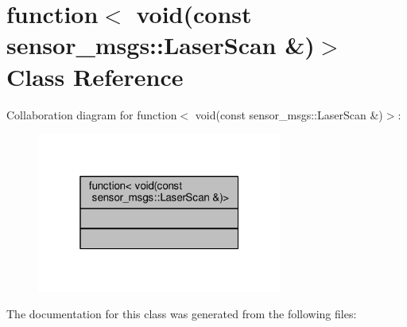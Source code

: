 \hypertarget{classstd_1_1function_3_01void_07const_01sensor__msgs_1_1LaserScan_01_6_08_4}{}\section{function$<$ void(const sensor\+\_\+msgs\+:\+:Laser\+Scan \&)$>$ Class Reference}
\label{classstd_1_1function_3_01void_07const_01sensor__msgs_1_1LaserScan_01_6_08_4}


Collaboration diagram for function$<$ void(const sensor\+\_\+msgs\+:\+:Laser\+Scan \&)$>$\+:\nopagebreak
\begin{figure}[H]
\begin{center}
\leavevmode
\includegraphics[width=229pt]{classstd_1_1function_3_01void_07const_01sensor__msgs_1_1LaserScan_01_6_08_4__coll__graph}
\end{center}
\end{figure}


The documentation for this class was generated from the following files\+: